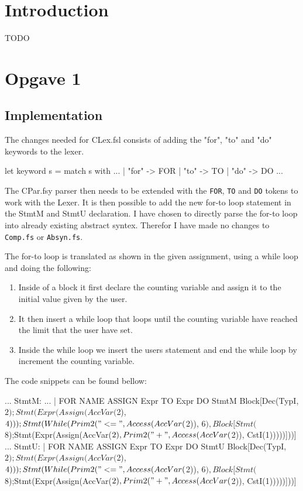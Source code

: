\section*{Introduction}
TODO

\section{Opgave 1}
\subsection{Implementation}
The changes needed for CLex.fsl consists of adding the "for", "to" and "do"
keywords to the lexer.
\begin{fs}
let keyword s =
    match s with
    ...
    | "for"     -> FOR
    | "to"      -> TO
    | "do"      -> DO
    ...
\end{fs}
The CPar.fsy parser then needs to be extended with the \texttt{FOR}, \texttt{TO}
and \texttt{DO} tokens to work with the Lexer. It is then possible to add the
new for-to loop statement in the StmtM and StmtU declaration. I have chosen to
directly parse the for-to loop into already existing abstract syntex. Therefor I
have made no changes to \texttt{Comp.fs} or \texttt{Absyn.fs}.

The for-to loop is translated as shown in the given assignment, using a while
loop and doing the following: 
\begin{enumerate}
    \item Inside of a block it first declare the counting variable and assign it
        to the initial value given by the user. 
    \item It then insert a while loop that loops until the counting variable
        have reached the limit that the user have set. 
    \item Inside the while loop we insert the users statement and end the while
        loop by increment the counting variable.
\end{enumerate}
The code snippets can be found bellow:

\begin{fs}
...
StmtM:
...
  | FOR NAME ASSIGN Expr TO Expr DO StmtM { Block[Dec(TypI, $2); Stmt(Expr(Assign(AccVar($2), $4))); Stmt(While(Prim2("<=", Access(AccVar($2)), $6), Block[Stmt($8);Stmt(Expr(Assign(AccVar($2), Prim2("+", Access(AccVar($2)), CstI(1)))))]))] }
...
StmtU:
  | FOR NAME ASSIGN Expr TO Expr DO StmtU { Block[Dec(TypI, $2); Stmt(Expr(Assign(AccVar($2), $4))); Stmt(While(Prim2("<=", Access(AccVar($2)), $6), Block[Stmt($8);Stmt(Expr(Assign(AccVar($2), Prim2("+", Access(AccVar($2)), CstI(1)))))]))] }
\end{fs}

